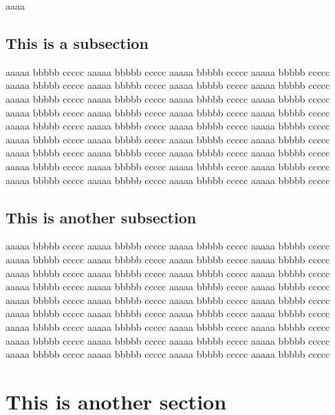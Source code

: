 \documentclass{thesul}
\begin{document}
aaaa

\subsection{This is a subsection}
aaaaa bbbbb ccccc aaaaa bbbbb ccccc aaaaa bbbbb ccccc aaaaa bbbbb
ccccc aaaaa bbbbb ccccc aaaaa bbbbb ccccc aaaaa bbbbb ccccc aaaaa
bbbbb ccccc aaaaa bbbbb ccccc aaaaa bbbbb ccccc aaaaa bbbbb ccccc
aaaaa bbbbb ccccc aaaaa bbbbb ccccc aaaaa bbbbb ccccc aaaaa bbbbb
ccccc aaaaa bbbbb ccccc aaaaa bbbbb ccccc aaaaa bbbbb ccccc aaaaa
bbbbb ccccc aaaaa bbbbb ccccc aaaaa bbbbb ccccc aaaaa bbbbb ccccc
aaaaa bbbbb ccccc aaaaa bbbbb ccccc aaaaa bbbbb ccccc aaaaa bbbbb
ccccc aaaaa bbbbb ccccc aaaaa bbbbb ccccc aaaaa bbbbb ccccc aaaaa
bbbbb ccccc aaaaa bbbbb ccccc aaaaa bbbbb ccccc aaaaa bbbbb ccccc
aaaaa bbbbb ccccc aaaaa bbbbb ccccc aaaaa bbbbb ccccc

\subsection{This is another subsection}
aaaaa bbbbb ccccc aaaaa bbbbb ccccc aaaaa bbbbb ccccc aaaaa bbbbb
ccccc aaaaa bbbbb ccccc aaaaa bbbbb ccccc aaaaa bbbbb ccccc aaaaa
bbbbb ccccc aaaaa bbbbb ccccc aaaaa bbbbb ccccc aaaaa bbbbb ccccc
aaaaa bbbbb ccccc aaaaa bbbbb ccccc aaaaa bbbbb ccccc aaaaa bbbbb
ccccc aaaaa bbbbb ccccc aaaaa bbbbb ccccc aaaaa bbbbb ccccc aaaaa
bbbbb ccccc aaaaa bbbbb ccccc aaaaa bbbbb ccccc aaaaa bbbbb ccccc
aaaaa bbbbb ccccc aaaaa bbbbb ccccc aaaaa bbbbb ccccc aaaaa bbbbb
ccccc aaaaa bbbbb ccccc aaaaa bbbbb ccccc aaaaa bbbbb ccccc aaaaa
bbbbb ccccc aaaaa bbbbb ccccc aaaaa bbbbb ccccc aaaaa bbbbb ccccc
aaaaa bbbbb ccccc aaaaa bbbbb ccccc aaaaa bbbbb ccccc

\section{This is another section}



\end{document}
